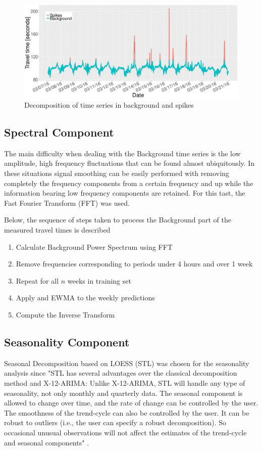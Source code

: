 \documentclass[conference]{IEEEtran}
\begin{document}
\begin{figure}[htbp]
	\centering
	\includegraphics[width=0.95\linewidth]{BS.pdf}
	\caption{ Decomposition of time series in background and spikes }
	\label{fig:Background}
\end{figure}



\subsection{Spectral Component}
The main difficulty when dealing with the Background time series is the low amplitude, high frequency fluctuations that can be found almost ubiquitously. In these situations signal smoothing can be easily performed with removing completely the frequency components from a certain frequency and up while the information bearing low frequency components are retained. For this tast, the Fast Fourier Transform (FFT) \cite{FFT} was used.

Below, the sequence of steps taken to process the Background part of the measured travel times is described
\begin{enumerate}

	\item Calculate Background Power Spectrum using FFT
	\item Remove frequencies corresponding to periods under 4 hours and over 1 week
	\item Repeat for all $n$ weeks in training set
    \item Apply and EWMA to the weekly predictions
	\item Compute the Inverse Transform

\end{enumerate}
\subsection{Seasonality Component}
Seasonal Decomposition based on LOESS (STL) \cite{STL} was chosen for the seasonality analysis since "STL has several advantages over the classical decomposition method and X-12-ARIMA: Unlike X-12-ARIMA, STL will handle any type of seasonality, not only monthly and quarterly data. The seasonal component is allowed to change over time, and the rate of change can be controlled by the user. The smoothness of the trend-cycle can also be controlled by the user. It can be robust to outliers (i.e., the user can specify a robust decomposition). So occasional unusual observations will not affect the estimates of the trend-cycle and seasonal components" \cite{forecasting}.\\
\end{document}
